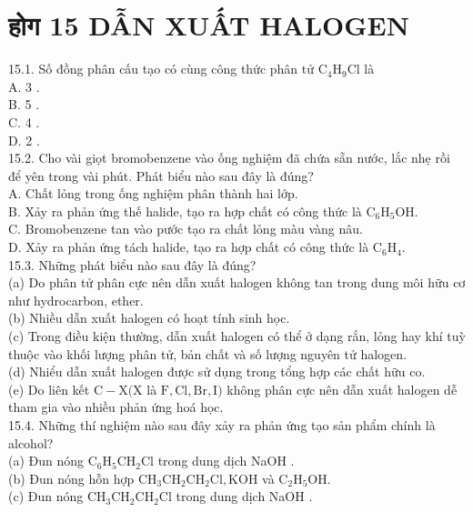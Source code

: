 \documentclass[10pt]{article}
\begin{document}
\section*{होग 15 DẪN XUẤT HALOGEN}
15.1. Số đồng phân cấu tạo có cùng công thức phân tử $\mathrm{C}_{4} \mathrm{H}_{9} \mathrm{Cl}$ là\\
A. 3 .\\
B. 5 .\\
C. 4 .\\
D. 2 .\\
15.2. Cho vài giọt bromobenzene vào ống nghiệm đã chứa sẵn nước, lắc nhẹ rồi để yên trong vài phút. Phát biểu nào sau đây là đúng?\\
A. Chất lỏng trong ống nghiệm phân thành hai lớp.\\
B. Xảy ra phản ứng thế halide, tạo ra hợp chất có công thức là $\mathrm{C}_{6} \mathrm{H}_{5} \mathrm{OH}$.\\
C. Bromobenzene tan vào pước tạo ra chất lỏng màu vàng nâu.\\
D. Xảy ra phản ứng tách halide, tạo ra hợp chất có công thức là $\mathrm{C}_{6} \mathrm{H}_{4}$.\\
15.3. Những phát biểu nào sau đây là đúng?\\
(a) Do phân tử phân cực nên dẫn xuất halogen không tan trong dung môi hữu cơ như hydrocarbon, ether.\\
(b) Nhiều dẫn xuất halogen có hoạt tính sinh học.\\
(c) Trong điều kiện thường, dẫn xuất halogen có thể ở dạng rắn, lỏng hay khí tuỳ thuộc vào khối lượng phân tử, bản chất và số lượng nguyên tử halogen.\\
(d) Nhiểu dẫn xuất halogen được sử dụng trong tổng hợp các chất hữu co.\\
(e) Do liên kết $\mathrm{C}-\mathrm{X}(\mathrm{X}$ là $\mathrm{F}, \mathrm{Cl}, \mathrm{Br}, \mathrm{I})$ không phân cực nên dẫn xuất halogen dễ tham gia vào nhiều phản ứng hoá học.\\
15.4. Những thí nghiệm nào sau đây xảy ra phản ứng tạo sản phẩm chính là alcohol?\\
(a) Đun nóng $\mathrm{C}_{6} \mathrm{H}_{5} \mathrm{CH}_{2} \mathrm{Cl}$ trong dung dịch NaOH .\\
(b) Đun nóng hỗn hợp $\mathrm{CH}_{3} \mathrm{CH}_{2} \mathrm{CH}_{2} \mathrm{Cl}, \mathrm{KOH}$ và $\mathrm{C}_{2} \mathrm{H}_{5} \mathrm{OH}$.\\
(c) Đun nóng $\mathrm{CH}_{3} \mathrm{CH}_{2} \mathrm{CH}_{2} \mathrm{Cl}$ trong dung dịch NaOH .\\
\end{document}
